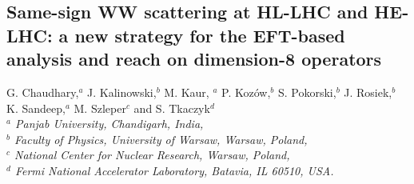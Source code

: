 \documentclass[../report.tex]{subfiles}
\providecommand{\main}{..}
\begin{document}


\newpage

\subsection{ Same-sign WW scattering at HL-LHC and HE-LHC: a new strategy for the EFT-based analysis and reach on dimension-8 operators}\label{sect-ssWW}
\begin{center}
 {G. Chaudhary,$^a$ 
 J. Kalinowski,$^{b} $
 M. Kaur, $^a$
P. Koz{\'o}w,$^b$ S. Pokorski,$^b$
J. Rosiek,$^b$ \\
K. Sandeep,$^a$ 
M. Szleper$^c$ 
and
S. Tkaczyk$^d$\\
}
 {\small \it
$^a$ Panjab University, Chandigarh, India,\\
 $^b$ Faculty of Physics, University of Warsaw, Warsaw,  Poland, \\
$^c$ National Center for Nuclear Research,  Warsaw, Poland, \\
$^d$  Fermi National Accelerator Laboratory, Batavia, IL 60510, USA.}
\end{center}




 

\end{document}
